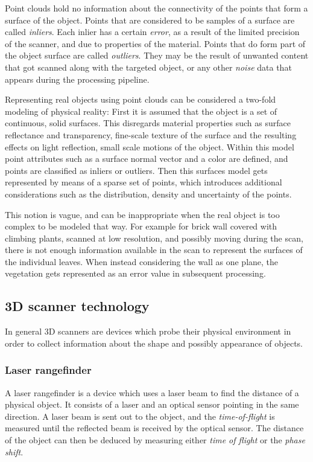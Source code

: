Point clouds hold no information about the connectivity of the points that form a surface of the object. Points that are considered to be samples of a surface are called \emph{inliers}. Each inlier has a certain \emph{error}, as a result of the limited precision of the scanner, and due to properties of the material. Points that do form part of the object surface are called \emph{outliers}. They may be the result of unwanted content that got scanned along with the targeted object, or any other \emph{noise} data that appears during the processing pipeline.

Representing real objects using point clouds can be considered a two-fold modeling of physical reality: First it is assumed that the object is a set of continuous, solid surfaces. This disregards material properties such as surface reflectance and transparency, fine-scale texture of the surface and the resulting effects on light reflection, small scale motions of the object. Within this model point attributes such as a surface normal vector and a color are defined, and points are classified as inliers or outliers. Then this surfaces model gets represented by means of a sparse set of points, which introduces additional considerations such as the distribution, density and uncertainty of the points.

This notion is vague, and can be inappropriate when the real object is too complex to be modeled that way. For example for brick wall covered with climbing plants, scanned at low resolution, and possibly moving during the scan, there is not enough information available in the scan to represent the surfaces of the individual leaves. When instead considering the wall as one plane, the vegetation gets represented as an error value in subsequent processing.

\subsection{3D scanner technology}
In general 3D scanners are devices which probe their physical environment in order to collect information about the shape and possibly appearance of objects.

\subsubsection{Laser rangefinder}
A laser rangefinder is a device which uses a laser beam to find the distance of a physical object. It consists of a laser and an optical sensor pointing in the same direction. A laser beam is sent out to the object, and the \emph{time-of-flight} is measured until the reflected beam is received by the optical sensor. The distance of the object can then be deduced by measuring either \emph{time of flight} or the \emph{phase shift}.

